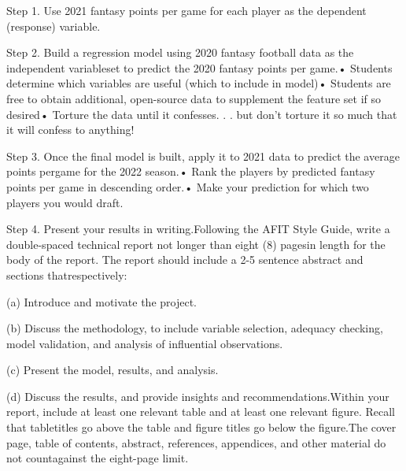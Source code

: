 Step 1. Use 2021 fantasy points per game for each player as the dependent (response) variable.

Step 2. Build a regression model using 2020 fantasy football data as the independent variableset to predict the 2020 fantasy points per game.• Students determine which variables are useful (which to include in model)• Students are free to obtain additional, open-source data to supplement the feature set if so desired• Torture the data until it confesses. . . but don’t torture it so much that it will confess to anything!

Step 3. Once the final model is built, apply it to 2021 data to predict the average points pergame for the 2022 season.• Rank the players by predicted fantasy points per game in descending order.• Make your prediction for which two players you would draft.

Step 4. Present your results in writing.Following the AFIT Style Guide, write a double-spaced technical report not longer than eight (8) pagesin length for the body of the report. The report should include a 2-5 sentence abstract and sections thatrespectively:

(a) Introduce and motivate the project.

(b) Discuss the methodology, to include variable selection, adequacy checking, model validation, and analysis of influential observations.

(c) Present the model, results, and analysis.

(d) Discuss the results, and provide insights and recommendations.Within your report, include at least one relevant table and at least one relevant figure. Recall that tabletitles go above the table and figure titles go below the figure.The cover page, table of contents, abstract, references, appendices, and other material do not countagainst the eight-page limit.